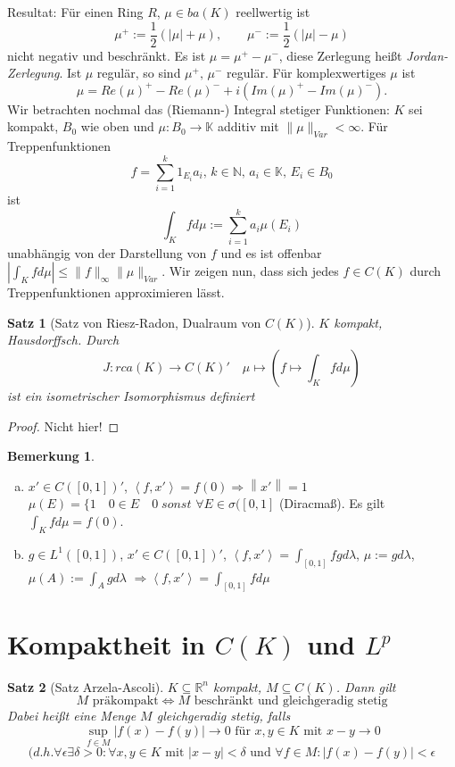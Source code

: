 \documentclass[ngerman]{report}
\theoremstyle{plain}%
\newtheorem{thm}{Satz}[chapter]
\theoremstyle{definition}%
\theoremstyle{myStyle}
\newtheorem*{bem*}{Bemerkung}
\newcommand{\R}{\mathbb{R}}
\newcommand{\N}{\mathbb{N}}
\newcommand{\K}{\mathbb{K}}
\newcommand{\norm}[1]{\left \|#1\right\| }
\newcommand{\df}[1][]{%
	\overset{#1}{\Rightarrow}
}
\newcommand{\aq}{\Leftrightarrow} %
\newcommand{\abs}[1]{\left\lvert #1 \right\rvert }
\newcommand{\fop}[1]{\left \langle #1 \right \rangle} %
\begin{document}
	Resultat: Für einen Ring $R$, $\mu \in ba(K)$ reellwertig ist 
	$$\mu^+:=\frac{1}{2}(|\mu| + \mu),\qquad \mu^-:=\frac{1}{2}(|\mu| - \mu)$$
	nicht negativ und beschränkt.
	Es ist $\mu = \mu^+ - \mu^-$, diese Zerlegung heißt \textit{Jordan-Zerlegung}.
	Ist $\mu$ regulär, so sind $\mu^+,\,\mu^-$ regulär.
	Für komplexwertiges $\mu$ ist
	$$\mu = Re(\mu)^+ - Re(\mu)^- + i(Im(\mu)^+ -Im(\mu)^-).$$
	Wir betrachten nochmal das (Riemann-) Integral stetiger Funktionen:
	$K$ sei kompakt, $B_0$ wie oben und $\mu : B_0 \to \K$ additiv mit $\|\mu \|_{Var} < \infty$. Für Treppenfunktionen 
	$$f = \sum^k_{i=1} 1_{E_i} a_i,\, k\in\N,\,a_i\in\K,\,E_i\in B_0$$ 
	ist 
	$$\int_K f d\mu := \sum^k_{i=1} a_i \mu(E_i)$$
	unabhängig von der Darstellung von $f$ und es ist offenbar $\abs{\int_K fd\mu} \leq \|f\|_\infty \|\mu \|_{Var}$. 
	Wir zeigen nun, dass sich jedes $f \in C(K)$ durch Treppenfunktionen approximieren lässt.
	
	\begin{thm}[Satz von Riesz-Radon, Dualraum von $C(K)$]
		$K$ kompakt, Hausdorffsch. Durch
			$$ J: rca(K) \to C(K)' \quad \mu \mapsto (f\mapsto \int_K f d\mu)$$
		ist ein isometrischer Isomorphismus definiert
	\end{thm}
	
	\begin{proof}
		Nicht hier!
	\end{proof}

	\begin{bem*}
		\begin{enumerate}[a)]
			\item $x' \in C([0,1])'$, $\fop{f,x'} = f(0) \df \norm{x'} = 1$
			$\mu(E) = \{ 1 \quad 0\in E\quad 0\; sonst$ $\forall E\in\sigma([0,1]$ (Diracmaß). 
			Es gilt $\int_K f d\mu = f(0)$.
			\item $g\in L^1([0,1])$, $x' \in C([0,1])'$, $\fop{f,x'} = \int_{[0,1]} f g d\lambda$,
			$\mu := g d\lambda$, $\mu(A) := \int_{A} g d\lambda$ $\df \fop{f,x'} = \int_{[0,1]} f d\mu$
		\end{enumerate}
	\end{bem*}

	\section{Kompaktheit in $C(K)$ und $L^p$}

	\begin{thm}[Satz Arzela-Ascoli]
		$K\subseteq \R^n$ kompakt, $M\subseteq C(K)$. Dann gilt 	
			$$ M \text{ präkompakt} \aq M \text{ beschränkt} \text{ und } \text{gleichgeradig stetig}$$
		Dabei heißt eine Menge $M$ gleichgeradig stetig, falls 
			$$ \sup_{f\in M} |f(x) - f(y)| \to 0 \text{ für } x,y \in K \text{ mit } x - y \to 0$$
			$$ (d.h. \forall \epsilon \exists \delta > 0: \forall x,y \in K \text{ mit } |x-y| < \delta \text{ und } \forall f\in M: |f(x) - f(y)| < \epsilon$$
	\end{thm}
\end{document}
